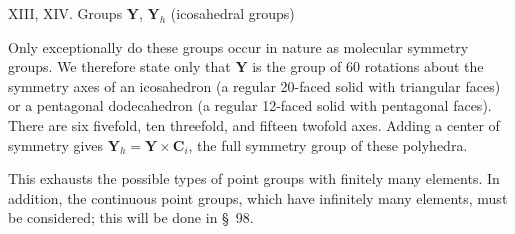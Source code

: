 \medskip
\noindent XIII, XIV. Groups $\boldsymbol{Y}$, $\boldsymbol{Y}_h$ (icosahedral groups)

Only exceptionally do these groups occur in nature as molecular symmetry groups. We therefore state only that $\boldsymbol{Y}$ is the group of 60 rotations about the symmetry axes of an icosahedron (a regular 20-faced solid with triangular faces) or a pentagonal dodecahedron (a regular 12-faced solid with pentagonal faces). There are six fivefold, ten threefold, and fifteen twofold axes. Adding a center of symmetry gives $\boldsymbol{Y}_h=\boldsymbol{Y}\times\boldsymbol{C}_i$, the full symmetry group of these polyhedra.

This exhausts the possible types of point groups with finitely many elements. In addition, the continuous point groups, which have infinitely many elements, must be considered; this will be done in \S~98.
